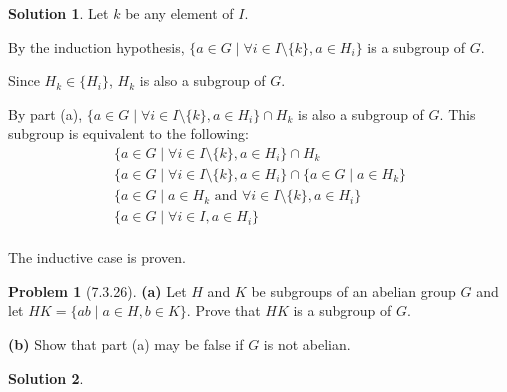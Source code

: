 \documentclass[12pt]{article}
\theoremstyle{definition}
\newtheorem*{prob}{Problem}
\newtheorem*{soln}{Solution}
\begin{document}
\begin{soln}
Let $k$ be any element of $I$.

By the induction hypothesis,
$\{a\in G\mid \forall i\in I\setminus \{k\}, a\in H_i\}$ is a subgroup of $G$.

Since $H_k\in\{H_i\}$, $H_k$ is also a subgroup of $G$.

By part (a),
$\{a\in G\mid \forall i\in I\setminus \{k\}, a\in H_i\}  \cap  H_k$
is also a subgroup of $G$.
This subgroup is equivalent to the following:
\begin{gather*}
\{a\in G\mid \forall i\in I\setminus \{k\}, a\in H_i\}  \cap  H_k\\
\{a\in G\mid \forall i\in I\setminus \{k\}, a\in H_i\}  \cap  \{a\in G\mid a\in H_k\}\\
\{a\in G\mid a\in H_k \text{ and } \forall i\in I\setminus \{k\}, a\in H_i\}\\
\{a\in G\mid \forall i\in I, a\in H_i\}\\
\end{gather*}

The inductive case is proven.

\end{soln}

\begin{prob}[7.3.26] \text{ }
\textbf{(a)}   Let $H$ and $K$ be subgroups of  an abelian group $G$ and let 
$HK = \{ab \mid a\in H, b\in K\}$. Prove that $HK$ is a subgroup of  $G$.

\textbf{(b)} Show that part (a) may be false if  $G$ is not abelian.
\end{prob}

\begin{soln}

\end{soln}
\end{document}
